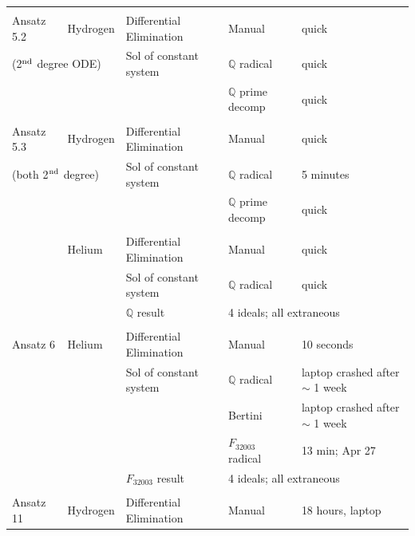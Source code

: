 \documentclass{article}
\def\R32003{$F_{32003}$}
\begin{document}
\begin{longtable}{lllll}
           &               &                         &                      &\\
Ansatz 5.2 &Hydrogen       &Differential Elimination &Manual                &quick\\
\multicolumn{2}{l}{(2$^{\rm nd}$ degree ODE)} &Sol of constant system   &$\mathbb{Q}$ radical            &quick\\
           &               &                         &$\mathbb{Q}$ prime decomp        &quick\\
           &               &                         &                      &\\
Ansatz 5.3 &Hydrogen       &Differential Elimination &Manual                &quick\\
\multicolumn{2}{l}{(both 2$^{\rm nd}$ degree)}   &Sol of constant system   &$\mathbb{Q}$ radical            &5 minutes\\
           &               &                         &$\mathbb{Q}$ prime decomp        &quick\\
           &               &                         &                      &\\
           &Helium         &Differential Elimination &Manual                &quick\\
           &               &Sol of constant system   &$\mathbb{Q}$ radical            &quick\\
           &               &$\mathbb{Q}$ result                 &\multicolumn{2}{l}{4 ideals; all extraneous}\\
           &               &                         &                      &\\
Ansatz 6   &Helium         &Differential Elimination &Manual                &10 seconds\\
           &               &Sol of constant system   &$\mathbb{Q}$ radical             &laptop crashed after $\sim$ 1 week\\
           &               &                         &Bertini               &laptop crashed after $\sim$ 1 week\\
           &               &                         &\R32003 radical        &13 min; Apr 27\\
           &               &\R32003 result            &\multicolumn{2}{l}{4 ideals; all extraneous}\\
           &               &                         &                      &\\
Ansatz 11  &Hydrogen       &Differential Elimination &Manual                &18 hours, laptop\\

\end{longtable}
\end{document}
